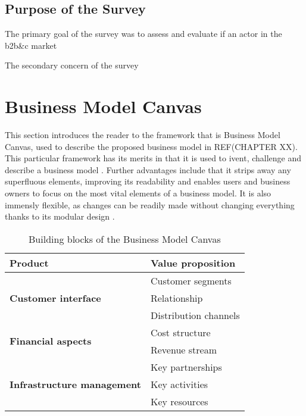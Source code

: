 \subsection{Purpose of the Survey}
The primary goal of the survey was to assess and evaluate if an actor in the \gls{b2b&c} market

The secondary concern of the survey


\section{Business Model Canvas}
This section introduces the reader to the framework that is Business Model Canvas, used to describe the proposed business model in REF(CHAPTER XX). This particular framework has its merits in that it is used to ivent, challenge and describe a business model \cite{strategyzer2016}. Further advantages include that it strips away any superfluous elements, improving its readability and enables users and business owners to focus on the most vital elements of a business model. It is also immensly flexible, as changes can be readily made without changing everything thanks to its modular design \cite{osterwalder2013business}. 
\newline
\\
\begin{table}[H]
\centering
\caption{Building blocks of the Business Model Canvas}
\label{tab:canvas}
\begin{tabular}{|l|l|}
\hline
\textbf{Product}                                    & Value proposition     \\ \hline
\multirow{3}{*}{\textbf{Customer interface}}        & Customer segments     \\ \cline{2-2} 
                                                    & Relationship          \\ \cline{2-2} 
                                                    & Distribution channels \\ \hline
\multirow{2}{*}{\textbf{Financial aspects}}         & Cost structure        \\ \cline{2-2} 
                                                    & Revenue stream        \\ \hline
\multirow{3}{*}{\textbf{Infrastructure management}} & Key partnerships      \\ \cline{2-2} 
                                                    & Key activities        \\ \cline{2-2} 
                                                    & Key resources         \\ \hline
\end{tabular}
\end{table}


